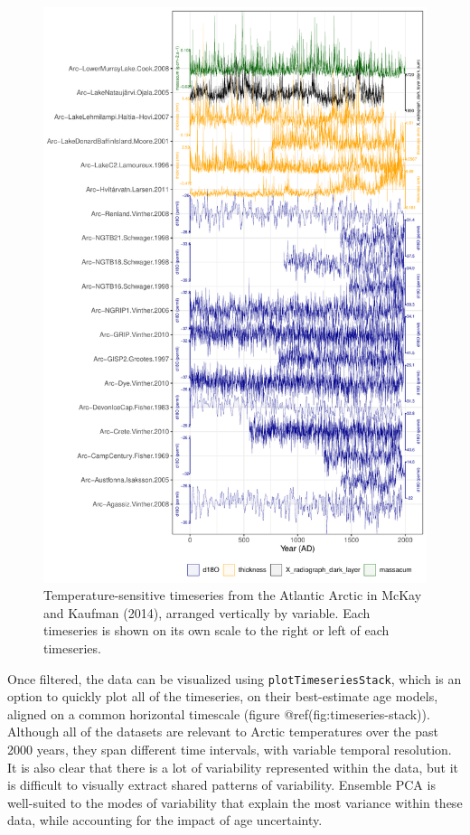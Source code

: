 \documentclass[gchron, manuscript]{copernicus}
\begin{document}
\begin{figure}
\includegraphics[width=12cm]{geoChronR-paper_files/figure-latex/timeseries-stack-2} \caption{Temperature-sensitive timeseries from the Atlantic Arctic in McKay and Kaufman (2014), arranged vertically by variable. Each timeseries is shown on its own scale to the right or left of each timeseries.}\label{fig:timeseries-stack-2}
\end{figure}

Once filtered, the data can be visualized using
\texttt{plotTimeseriesStack}, which is an option to quickly plot all of
the timeseries, on their best-estimate age models, aligned on a common
horizontal timescale (figure @ref(fig:timeseries-stack)). Although all
of the datasets are relevant to Arctic temperatures over the past 2000
years, they span different time intervals, with variable temporal
resolution. It is also clear that there is a lot of variability
represented within the data, but it is difficult to visually extract
shared patterns of variability. Ensemble PCA is well-suited to the modes
of variability that explain the most variance within these data, while
accounting for the impact of age uncertainty.
\end{document}
